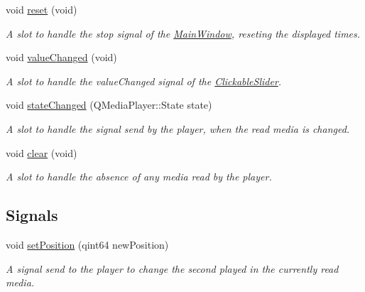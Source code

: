\begin{DoxyCompactItemize}
void \hyperlink{classStatusBar_af52f3efb90d4c83a5602dbbf210e8d79}{reset} (void)
\begin{DoxyCompactList}\small\item\em A slot to handle the stop signal of the \hyperlink{classMainWindow}{Main\+Window}, reseting the displayed times. \end{DoxyCompactList}\item 
\mbox{\label{classStatusBar_aa36e38a90475a85dc8d84b31efc4e834}} 
void \hyperlink{classStatusBar_aa36e38a90475a85dc8d84b31efc4e834}{value\+Changed} (void)
\begin{DoxyCompactList}\small\item\em A slot to handle the value\+Changed signal of the \hyperlink{classClickableSlider}{Clickable\+Slider}. \end{DoxyCompactList}\item 
void \hyperlink{classStatusBar_a58be568ef32791d26f2d45063189c4af}{state\+Changed} (Q\+Media\+Player\+::\+State state)
\begin{DoxyCompactList}\small\item\em A slot to handle the signal send by the player, when the read media is changed. \end{DoxyCompactList}\item 
\mbox{\label{classStatusBar_a7beb68db1b57bc79cb2502239ebc7585}} 
void \hyperlink{classStatusBar_a7beb68db1b57bc79cb2502239ebc7585}{clear} (void)
\begin{DoxyCompactList}\small\item\em A slot to handle the absence of any media read by the player. \end{DoxyCompactList}\end{DoxyCompactItemize}
\subsection*{Signals}
\begin{DoxyCompactItemize}
\item 
void \hyperlink{classStatusBar_adf37ac3b2bf684e9d9d53c8ea345b0b9}{set\+Position} (qint64 new\+Position)
\begin{DoxyCompactList}\small\item\em A signal send to the player to change the second played in the currently read media. \end{DoxyCompactList}\end{DoxyCompactItemize}
